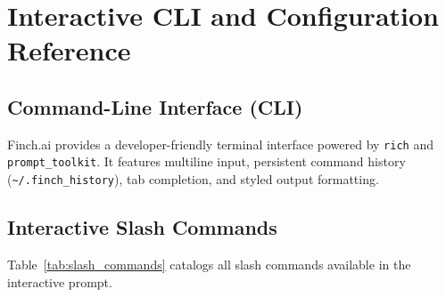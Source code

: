 \chapter{Interactive CLI and Configuration Reference}
\label{chap:cli_config}

\section{Command-Line Interface (CLI)}
Finch.ai provides a developer-friendly terminal interface powered by \texttt{rich} and \texttt{prompt\_toolkit}. It features multiline input, persistent command history (\texttt{\textasciitilde/.finch\_history}), tab completion, and styled output formatting.

\section{Interactive Slash Commands}
Table~\ref{tab:slash_commands} catalogs all slash commands available in the interactive prompt.

